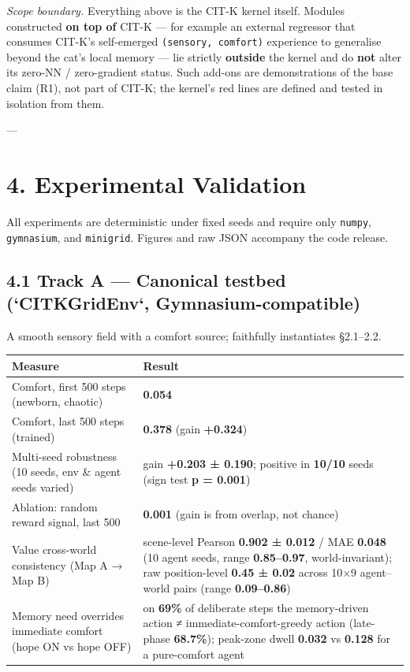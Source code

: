 \documentclass[11pt]{article}
\begin{document}
\emph{Scope boundary.} Everything above is the CIT-K kernel itself. Modules constructed \textbf{on top of} CIT-K — for example an external regressor that consumes CIT-K's self-emerged \texttt{(sensory, comfort)} experience to generalise beyond the cat's local memory — lie strictly \textbf{outside} the kernel and do \textbf{not} alter its zero-NN / zero-gradient status. Such add-ons are demonstrations of the base claim (R1), not part of CIT-K; the kernel's red lines are defined and tested in isolation from them.

---

\section{4. Experimental Validation}

All experiments are deterministic under fixed seeds and require only \texttt{numpy}, \texttt{gymnasium}, and \texttt{minigrid}. Figures and raw JSON accompany the code release.

\subsection{4.1 Track A — Canonical testbed (`CITKGridEnv`, Gymnasium-compatible)}
A smooth sensory field with a comfort source; faithfully instantiates §2.1–2.2.

\begin{table}[ht]\centering
\begin{tabular}{ll}
\toprule
Measure & Result \\
\midrule
Comfort, first 500 steps (newborn, chaotic) & \textbf{0.054} \\
Comfort, last 500 steps (trained) & \textbf{0.378} (gain \textbf{+0.324}) \\
Multi-seed robustness (10 seeds, env \& agent seeds varied) & gain \textbf{+0.203 ± 0.190}; positive in \textbf{10/10} seeds (sign test \textbf{p = 0.001}) \\
Ablation: random reward signal, last 500 & \textbf{0.001} (gain is from overlap, not chance) \\
Value cross-world consistency (Map A → Map B) & scene-level Pearson \textbf{0.902 ± 0.012} / MAE \textbf{0.048} (10 agent seeds, range \textbf{0.85–0.97}, world-invariant); raw position-level \textbf{0.45 ± 0.02} across 10×9 agent–world pairs (range \textbf{0.09–0.86}) \\
Memory need overrides immediate comfort (hope ON vs hope OFF) & on \textbf{69\%} of deliberate steps the memory-driven action ≠ immediate-comfort-greedy action (late-phase \textbf{68.7\%}); peak-zone dwell \textbf{0.032} vs \textbf{0.128} for a pure-comfort agent \\
\bottomrule
\end{tabular}
\end{table}
\end{document}
